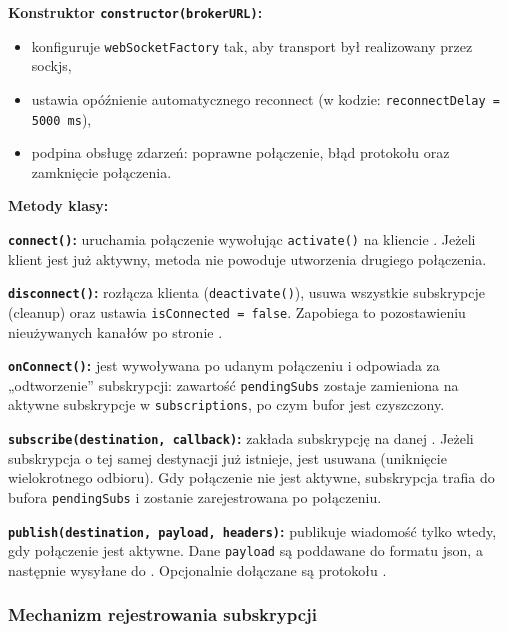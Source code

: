 \textbf{Konstruktor \texttt{constructor(brokerURL)}:}
\begin{itemize}
    \item konfiguruje \texttt{webSocketFactory} tak, aby transport był realizowany przez \gls{sockjs},
    \item ustawia opóźnienie automatycznego \gls{reconnect} (w kodzie: \texttt{reconnectDelay = 5000 ms}),
    \item podpina obsługę zdarzeń: poprawne połączenie, błąd protokołu oraz zamknięcie połączenia.
\end{itemize}

\medskip
\textbf{Metody klasy:}

\textbf{\texttt{connect()}:}
uruchamia połączenie wywołując \texttt{activate()} na kliencie .
Jeżeli klient jest już aktywny, metoda nie powoduje utworzenia drugiego połączenia.

\textbf{\texttt{disconnect()}:}
rozłącza klienta (\texttt{deactivate()}), usuwa wszystkie subskrypcje (\gls{cleanup}) oraz ustawia \texttt{isConnected = false}.
Zapobiega to pozostawieniu nieużywanych kanałów po stronie .

\textbf{\texttt{onConnect()}:}
jest wywoływana po udanym połączeniu i odpowiada za „odtworzenie” subskrypcji:
zawartość \texttt{pendingSubs} zostaje zamieniona na aktywne subskrypcje w \texttt{subscriptions}, po czym bufor jest czyszczony.

\textbf{\texttt{subscribe(destination, callback)}:}
zakłada subskrypcję na danej .
Jeżeli subskrypcja o tej samej destynacji już istnieje, jest usuwana (uniknięcie wielokrotnego odbioru).
Gdy połączenie nie jest aktywne, subskrypcja trafia do bufora \texttt{pendingSubs} i zostanie zarejestrowana po połączeniu.

\textbf{\texttt{publish(destination, payload, headers)}:}
publikuje wiadomość tylko wtedy, gdy połączenie jest aktywne.
Dane \texttt{payload} są poddawane  do formatu \gls{json}, a następnie wysyłane do .
Opcjonalnie dołączane są  protokołu .

\subsubsection{Mechanizm rejestrowania subskrypcji}
\label{subsubsec:obsluga-subskrypcji-w-cyklu-zycia}

